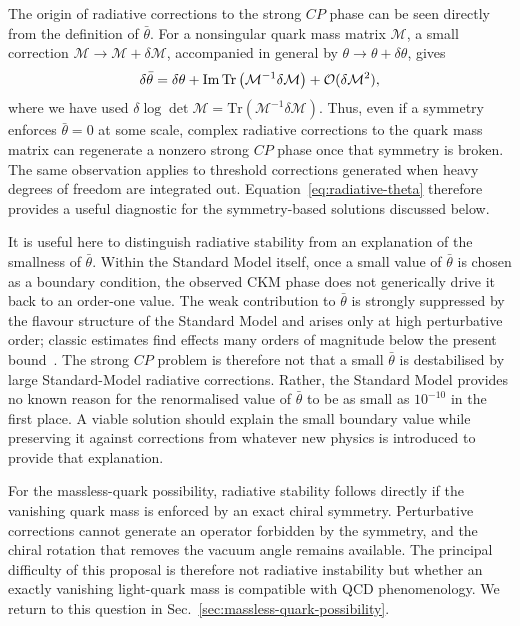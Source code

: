\documentclass[review]{elsarticle}
\numberwithin{equation}{section}
\numberwithin{table}{section}
\numberwithin{figure}{section}
\def\M{\mathcal{M}}
\def\tr{\mathrm{Tr}}
\begin{document}
The origin of radiative corrections to the strong $CP$ phase can be seen directly from the definition of $\bar\theta$. For a nonsingular quark mass matrix $\M$, a small correction $\M\to\M+\delta\M$, accompanied in general by $\theta\to\theta+\delta\theta$, gives
\begin{align}
    \delta\bar\theta = \delta\theta + {\rm Im}\,\tr\left(\M^{-1}\delta\M \right) +\mathcal{O}(\delta\M^2),
    \label{eq:radiative-theta}
\end{align}
where we have used $\delta\log\det\M=\tr(\M^{-1}\delta\M)$. Thus, even if a symmetry enforces $\bar\theta=0$ at some scale, complex radiative corrections to the quark mass matrix can regenerate a nonzero strong $CP$ phase once that symmetry is broken. The same observation applies to threshold corrections generated when heavy degrees of freedom are integrated out. Equation~\eqref{eq:radiative-theta} therefore provides a useful diagnostic for the symmetry-based solutions discussed below.

It is useful here to distinguish radiative stability from an explanation of the smallness of $\bar\theta$. Within the Standard Model itself, once a small value of $\bar\theta$ is chosen as a boundary condition, the observed CKM phase does not generically drive it back to an order-one value. The weak contribution to $\bar\theta$ is strongly suppressed by the flavour structure of the Standard Model and arises only at high perturbative order; classic estimates find effects many orders of magnitude below the present bound~\cite{Ellis:1978hq}. The strong $CP$ problem is therefore not that a small $\bar\theta$ is destabilised by large Standard-Model radiative corrections. Rather, the Standard Model provides no known reason for the renormalised value of $\bar\theta$ to be as small as $10^{-10}$ in the first place. A viable solution should explain the small boundary value while preserving it against corrections from whatever new physics is introduced to provide that explanation.

For the massless-quark possibility, radiative stability follows directly if the vanishing quark mass is enforced by an exact chiral symmetry. Perturbative corrections cannot generate an operator forbidden by the symmetry, and the chiral rotation that removes the vacuum angle remains available. The principal difficulty of this proposal is therefore not radiative instability but whether an exactly vanishing light-quark mass is compatible with QCD phenomenology. We return to this question in Sec.~\ref{sec:massless-quark-possibility}.
\end{document}
